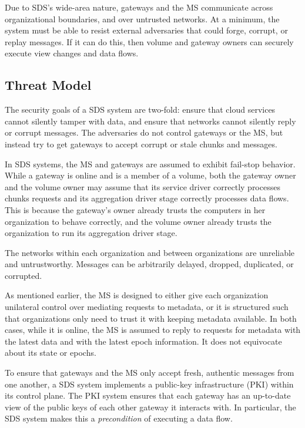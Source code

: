 Due to SDS's wide-area nature, gateways and the MS communicate
across organizational boundaries, and over untrusted networks.
At a minimum, the system must be able to resist external adversaries that could
forge, corrupt, or replay messages.  If it can do this, then volume and gateway owners can
securely execute view changes and data flows.

\subsection{Threat Model}

The security goals of a SDS system are two-fold:  ensure that cloud services
cannot silently tamper with data, and ensure that networks cannot silently reply
or corrupt messages.  The adversaries do not control gateways or the MS, but
instead try to get gateways to accept corrupt or stale chunks and messages.

In SDS systems, the MS and gateways are assumed to exhibit fail-stop behavior.
While a gateway is online and is a member of a volume, both the gateway owner
and the volume owner may assume that its service driver
correctly processes chunks requests and its 
aggregation driver stage correctly processes data flows.  This is because the
gateway's owner already trusts the computers in her organization to behave
correctly, and the volume owner already trusts the organization to run its
aggregation driver stage.

The networks within each organization and between organizations are unreliable
and untrustworthy.  Messages can be arbitrarily delayed, dropped, duplicated, or corrupted.

As mentioned earlier, the MS is designed to either give each organization
unilateral control over mediating requests to metadata, or it is structured such
that organizations only need to trust it with keeping metadata available.  In
both cases, while it is online, the MS is assumed to reply to requests for metadata with
the latest data and with the latest epoch information.  It does not equivocate
about its state or epochs.

To ensure that gateways and the MS only accept fresh, authentic messages from
one another, a SDS system implements a public-key infrastructure (PKI) within
its control plane.  The PKI system ensures that each gateway has an up-to-date
view of the public keys of each other gateway it interacts with.  In
particular, the SDS system makes this a \emph{precondition} of executing a data
flow.

